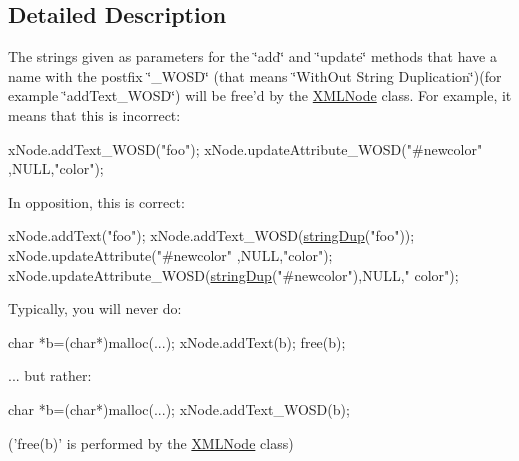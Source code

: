 \subsection{Detailed Description}
The strings given as parameters for the \char`\"{}add\char`\"{} and \char`\"{}update\char`\"{} methods that have a name with the postfix \char`\"{}\-\_\-\-W\-O\-S\-D\char`\"{} (that means \char`\"{}\-With\-Out String Duplication\char`\"{})(for example \char`\"{}add\-Text\-\_\-\-W\-O\-S\-D\char`\"{}) will be free'd by the \hyperlink{structXMLNode}{X\-M\-L\-Node} class. For example, it means that this is incorrect\-: 
\begin{DoxyCode}
           xNode.addText\_WOSD(\textcolor{stringliteral}{"foo"});
           xNode.updateAttribute\_WOSD(\textcolor{stringliteral}{"#newcolor"} ,NULL,\textcolor{stringliteral}{"color"});
\end{DoxyCode}
 In opposition, this is correct\-: 
\begin{DoxyCode}
           xNode.addText(\textcolor{stringliteral}{"foo"});
           xNode.addText\_WOSD(\hyperlink{group__StringAlloc_gac35b3be05a320f835b3976179637fe76}{stringDup}(\textcolor{stringliteral}{"foo"}));
           xNode.updateAttribute(\textcolor{stringliteral}{"#newcolor"} ,NULL,\textcolor{stringliteral}{"color"});
           xNode.updateAttribute\_WOSD(\hyperlink{group__StringAlloc_gac35b3be05a320f835b3976179637fe76}{stringDup}(\textcolor{stringliteral}{"#newcolor"}),NULL,\textcolor{stringliteral}{"
      color"});
\end{DoxyCode}
 Typically, you will never do\-: 
\begin{DoxyCode}
           \textcolor{keywordtype}{char} *b=(\textcolor{keywordtype}{char}*)malloc(...);
           xNode.addText(b);
           free(b);
\end{DoxyCode}
 ... but rather\-: 
\begin{DoxyCode}
           \textcolor{keywordtype}{char} *b=(\textcolor{keywordtype}{char}*)malloc(...);
           xNode.addText\_WOSD(b);
\end{DoxyCode}
 ('free(b)' is performed by the \hyperlink{structXMLNode}{X\-M\-L\-Node} class) 

